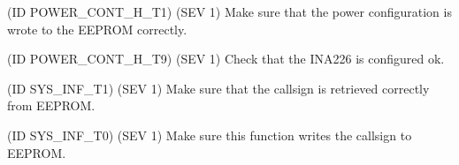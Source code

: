 \begin{DoxyRefList}
\item[\label{test__test000040}%
\Hypertarget{test__test000040}%
Global \hyperlink{power__control_8h_a18bd8cf80280cfba12636778283abf78}{Power\+\_\+\+Control\+\_\+\+Save\+\_\+\+Configuration} ()](ID P\+O\+W\+E\+R\+\_\+\+C\+O\+N\+T\+\_\+\+H\+\_\+\+T1) (S\+EV 1) Make sure that the power configuration is wrote to the E\+E\+P\+R\+OM correctly. 
\item[\label{test__test000044}%
\Hypertarget{test__test000044}%
Global \hyperlink{power__control_8h_af06e9b8ca5da269e5b0bf31debe17740}{Power\+\_\+\+Control\+\_\+\+Setup\+\_\+\+I\+N\+A226} ()](ID P\+O\+W\+E\+R\+\_\+\+C\+O\+N\+T\+\_\+\+H\+\_\+\+T9) (S\+EV 1) Check that the I\+N\+A226 is configured ok. 
\item[\label{test__test000050}%
\Hypertarget{test__test000050}%
Global \hyperlink{system__info_8h_a4ba2aee682a65d201b020b7fcf20939c}{System\+\_\+\+Info\+\_\+\+Get\+\_\+\+Callsign} (char $\ast$buff, uint8\+\_\+t len)](ID S\+Y\+S\+\_\+\+I\+N\+F\+\_\+\+T1) (S\+EV 1) Make sure that the callsign is retrieved correctly from E\+E\+P\+R\+OM. 
\item[\label{test__test000049}%
\Hypertarget{test__test000049}%
Global \hyperlink{system__info_8h_a51295b55492a253ad9c695525c40d458}{System\+\_\+\+Info\+\_\+\+Set\+\_\+\+Callsign} (char $\ast$new\+Callsign)](ID S\+Y\+S\+\_\+\+I\+N\+F\+\_\+\+T0) (S\+EV 1) Make sure this function writes the callsign to E\+E\+P\+R\+OM.
\end{DoxyRefList}